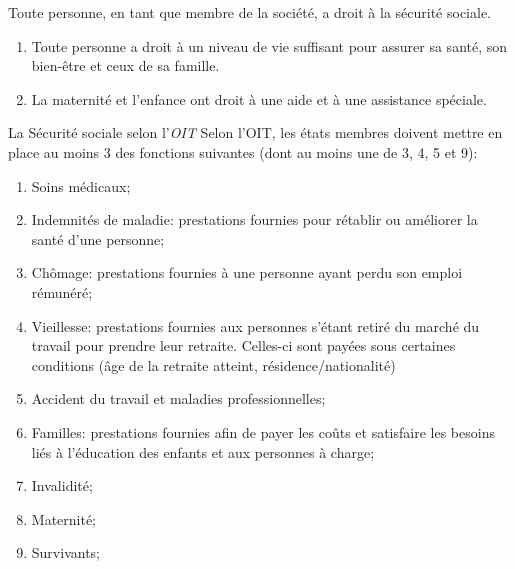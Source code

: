 \documentclass[10pt, french]{article}
\begin{document}
\begin{multicols*}{3}
\begin{rappel_enhanced}
\begin{distributions}[Article 22]
Toute personne, en tant que membre de la société, a droit à la sécurité sociale.
\end{distributions}
\begin{distributions}[Article 25]
\begin{enumerate}[leftmargin = *]
	\item	Toute personne a droit à un niveau de vie suffisant pour assurer sa santé, son bien-être et ceux de sa famille.
	\item	La maternité et l'enfance ont droit à une aide et à une assistance spéciale.
\end{enumerate}
\end{distributions}
\end{rappel_enhanced}

\begin{conceptgen}{La Sécurité sociale selon l'\textit{OIT}}
Selon l'OIT, les états membres doivent mettre en place au moins 3 des fonctions suivantes (dont au moins une de 3, 4, 5 et 9): 
\begin{enumerate}[leftmargin = *]
	\item	Soins médicaux;
	\item	Indemnités de maladie: prestations fournies pour rétablir ou améliorer la santé d'une personne;
	\item	Chômage: prestations fournies à une personne ayant perdu son emploi rémunéré;
	\item	Vieillesse: prestations fournies aux personnes s'étant retiré du marché du travail pour prendre leur retraite. Celles-ci sont payées sous certaines conditions (âge de la retraite atteint, résidence/nationalité)
	\item	Accident du travail et maladies professionnelles;
	\item	Familles: prestations fournies afin de payer les coûts et satisfaire les besoins liés à l'éducation des enfants et aux personnes à charge;
	\item	Invalidité;
	\item	Maternité;
	\item	Survivants;
\end{enumerate}


\end{conceptgen}
\end{multicols*}
\end{document}
